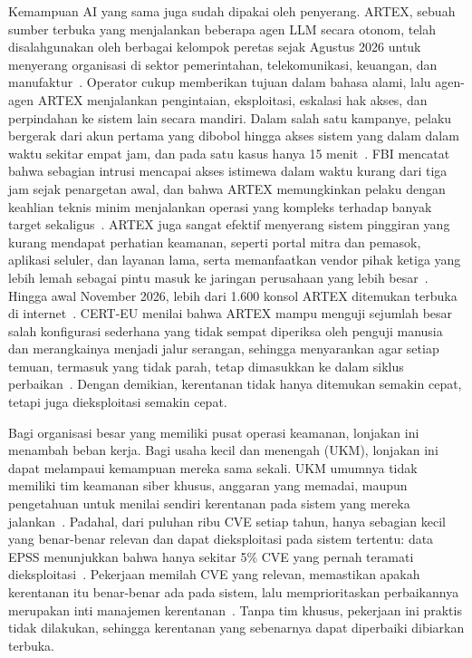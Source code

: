 Kemampuan AI yang sama juga sudah dipakai oleh penyerang. ARTEX, sebuah
  sumber terbuka yang menjalankan
beberapa agen LLM secara otonom, telah disalahgunakan oleh berbagai kelompok
peretas sejak Agustus 2026 untuk menyerang organisasi di sektor pemerintahan,
telekomunikasi, keuangan, dan manufaktur~\cite{gtig2026artex}. Operator cukup
memberikan tujuan dalam bahasa alami, lalu agen-agen ARTEX menjalankan
pengintaian, eksploitasi, eskalasi hak akses, dan perpindahan ke sistem lain
secara mandiri. Dalam salah satu kampanye, pelaku bergerak dari akun pertama
yang dibobol hingga akses sistem yang dalam dalam waktu sekitar empat jam, dan
pada satu kasus hanya 15 menit~\cite{gtig2026artex}. FBI mencatat bahwa
sebagian intrusi mencapai akses istimewa dalam waktu kurang dari tiga jam sejak
penargetan awal, dan bahwa ARTEX memungkinkan pelaku dengan keahlian teknis
minim menjalankan operasi yang kompleks terhadap banyak target
sekaligus~\cite{fbi2026artex}. ARTEX juga sangat efektif menyerang sistem
pinggiran yang kurang mendapat perhatian keamanan, seperti portal mitra dan
pemasok,  aplikasi seluler, dan layanan lama, serta memanfaatkan
vendor pihak ketiga yang lebih lemah sebagai pintu masuk ke jaringan perusahaan
yang lebih besar~\cite{fbi2026artex}. Hingga awal November 2026, lebih dari 1.600
konsol ARTEX ditemukan terbuka di internet~\cite{fbi2026artex}. CERT-EU menilai bahwa
ARTEX mampu menguji sejumlah besar salah konfigurasi sederhana yang tidak
sempat diperiksa oleh penguji manusia dan merangkainya menjadi jalur serangan,
sehingga menyarankan agar setiap temuan, termasuk yang tidak parah, tetap
dimasukkan ke dalam siklus perbaikan~\cite{certeu2026artex}. Dengan demikian,
kerentanan tidak hanya ditemukan semakin cepat, tetapi juga dieksploitasi
semakin cepat.

Bagi organisasi besar yang memiliki pusat operasi keamanan, lonjakan ini
menambah beban kerja. Bagi usaha kecil dan menengah (UKM), lonjakan ini dapat
melampaui kemampuan mereka sama sekali. UKM umumnya tidak memiliki tim keamanan
siber khusus, anggaran yang memadai, maupun pengetahuan untuk menilai sendiri
kerentanan pada sistem yang mereka
jalankan~\cite{chaudharyQuestResearchKnowledge2023,michalekCyberIncidentPrevention2026}.
Padahal, dari puluhan ribu CVE setiap tahun, hanya sebagian kecil yang benar-benar
relevan dan dapat dieksploitasi pada sistem tertentu: data EPSS menunjukkan bahwa
hanya sekitar 5\% CVE yang pernah teramati dieksploitasi~\cite{hand2026vulnpocalypse}.
Pekerjaan memilah CVE yang relevan, memastikan apakah kerentanan itu benar-benar
ada pada sistem, lalu memprioritaskan perbaikannya merupakan inti manajemen
kerentanan~\cite{syedCybersecurityVulnerabilityManagement2020,shimizuVulnerabilityManagementChaining2026}.
Tanpa tim khusus, pekerjaan ini praktis tidak dilakukan, sehingga kerentanan
yang sebenarnya dapat diperbaiki dibiarkan terbuka.

